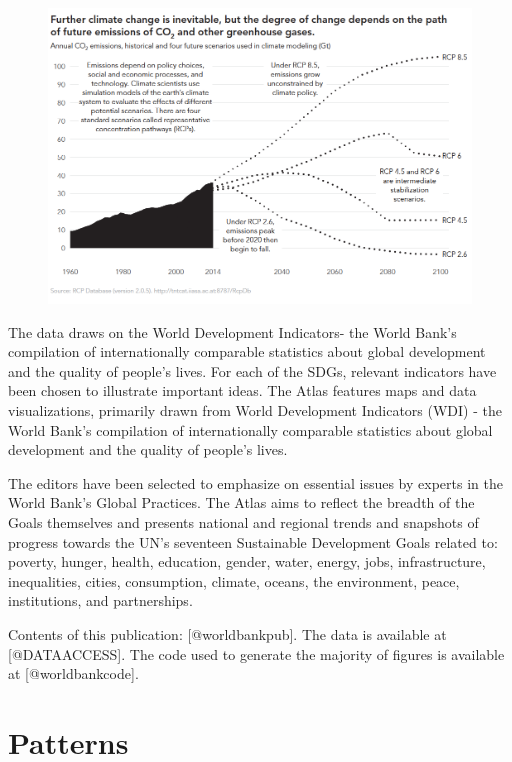 \documentclass[]{book}
\theoremstyle{definition}
\theoremstyle{definition}
\theoremstyle{definition}
\theoremstyle{remark}
\begin{document}
\begin{figure}
\centering
\includegraphics{images/case study 3.png}
\caption{}
\end{figure}

The data draws on the World Development Indicators- the World Bank's
compilation of internationally comparable statistics about global
development and the quality of people's lives. For each of the SDGs,
relevant indicators have been chosen to illustrate important ideas. The
Atlas features maps and data visualizations, primarily drawn from World
Development Indicators (WDI) - the World Bank's compilation of
internationally comparable statistics about global development and the
quality of people's lives.

The editors have been selected to emphasize on essential issues by
experts in the World Bank's Global Practices. The Atlas aims to reflect
the breadth of the Goals themselves and presents national and regional
trends and snapshots of progress towards the UN's seventeen Sustainable
Development Goals related to: poverty, hunger, health, education,
gender, water, energy, jobs, infrastructure, inequalities, cities,
consumption, climate, oceans, the environment, peace, institutions, and
partnerships.

Contents of this publication: {[}@worldbankpub{]}. The data is available
at {[}@DATAACCESS{]}. The code used to generate the majority of figures
is available at {[}@worldbankcode{]}.

\chapter{Patterns}\label{patterns}
\end{document}
